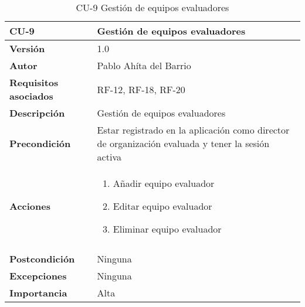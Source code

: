 \begin{table}[p]
	\centering
	\begin{tabularx}{\linewidth}{ p{} p{} }
		\toprule
		\textbf{CU-9}    & \textbf{Gestión de equipos evaluadores}\\
		\toprule
		\textbf{Versión}              & 1.0    \\
		\textbf{Autor}                & Pablo Ahíta del Barrio \\
		\textbf{Requisitos asociados} & RF-12, RF-18, RF-20\\
		\textbf{Descripción}          & Gestión de equipos evaluadores\\
		\textbf{Precondición}         & Estar registrado en la aplicación como director de organización evaluada y tener la sesión activa \\
		\textbf{Acciones}             &
		\begin{enumerate}
			\def\labelenumi{\arabic{enumi}.}
			\tightlist
			\item Añadir equipo evaluador
			\item Editar equipo evaluador
			\item Eliminar equipo evaluador
		\end{enumerate}\\
		\\
		\textbf{Postcondición}        & Ninguna \\
		\textbf{Excepciones}          & Ninguna \\
		\textbf{Importancia}          & Alta \\
		\bottomrule
	\end{tabularx}
	\caption{CU-9 Gestión de equipos evaluadores}
\end{table}

